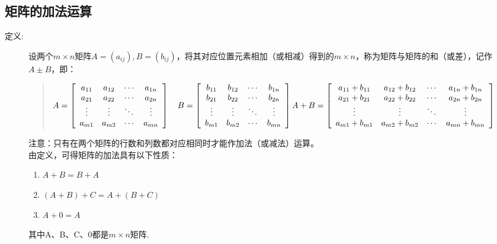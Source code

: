 \documentclass[a4paper,10pt]{article}
\begin{document}
\begin{CJK}{UTF8}{song}
\subsection{矩阵的加法运算}
\begin{description}
 \item[定义:] 设两个$m\times{}n$矩阵$A=(a_{ij}),B=(b_{ij})$，将其对应位置元素相加（或相减）得到的$m\times{}n$，称为矩阵与矩阵的和（或差），记作$A\pm{}B$，即：
\begin{quote}
$A=\left[\begin{array}{cccc}
a_{11}&a_{12}&\cdots{}&a_{1n} \\
a_{21}&a_{22}&\cdots{}&a_{2n} \\
\vdots&\vdots&\ddots{}&\vdots \\
a_{m1}&a_{m2}&\cdots{}&a_{mn} \\          
\end{array}\right]  \quad 
B=\left[\begin{array}{cccc}
b_{11}&b_{12}&\cdots{}&b_{1n} \\
b_{21}&b_{22}&\cdots{}&b_{2n} \\
\vdots&\vdots&\ddots{}&\vdots \\
b_{m1}&b_{m2}&\cdots{}&b_{mn} \\          
\end{array}\right]  \\
A+B=\left[\begin{array}{cccc}
a_{11}+b_{11}&a_{12}+b_{12}&\cdots{}&a_{1n}+b_{1n} \\
a_{21}+b_{21}&a_{22}+b_{22}&\cdots{}&a_{2n}+b_{2n} \\
\vdots&\vdots&\ddots{}&\vdots \\
a_{m1}+b_{m1}&a_{m2}+b_{m2}&\cdots{}&a_{mn}+b_{mn} \\          
\end{array}\right] 
$
\end{quote}
注意：只有在两个矩阵的行数和列数都对应相同时才能作加法（或减法）运算。 \\
由定义，可得矩阵的加法具有以下性质：
\begin{enumerate}
\item $A+B=B+A$
\item $(A+B)+C=A+(B+C)$
\item $A+0=A$
\end{enumerate}
其中A、B、C、0都是$m\times{}n$矩阵.
\end{description}


\end{CJK}
\end{document}
